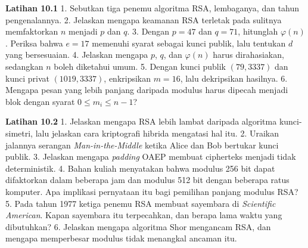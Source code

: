 
\begin{obereflection}
\textbf{Latihan 10.1}
1. Sebutkan tiga penemu algoritma RSA, lembaganya, dan tahun pengenalannya.
2. Jelaskan mengapa keamanan RSA terletak pada sulitnya memfaktorkan $n$
   menjadi $p$ dan $q$.
3. Dengan $p = 47$ dan $q = 71$, hitunglah $\varphi(n)$. Periksa bahwa
   $e = 17$ memenuhi syarat sebagai kunci publik, lalu tentukan $d$ yang
   bersesuaian.
4. Jelaskan mengapa $p$, $q$, dan $\varphi(n)$ harus dirahasiakan, sedangkan
   $n$ boleh diketahui umum.
5. Dengan kunci publik $(79, 3337)$ dan kunci privat $(1019, 3337)$,
   enkripsikan $m = 16$, lalu dekripsikan hasilnya.
6. Mengapa pesan yang lebih panjang daripada modulus harus dipecah menjadi
   blok dengan syarat $0 \le m_i \le n-1$?
\end{obereflection}

\begin{obereflection}
\textbf{Latihan 10.2}
1. Jelaskan mengapa RSA lebih lambat daripada algoritma kunci-simetri, lalu
   jelaskan cara kriptografi hibrida mengatasi hal itu.
2. Uraikan jalannya serangan \textit{Man-in-the-Middle} ketika Alice dan Bob
   bertukar kunci publik.
3. Jelaskan mengapa \textit{padding} OAEP membuat cipherteks menjadi tidak
   deterministik.
4. Bahan kuliah menyatakan bahwa modulus 256 bit dapat difaktorkan dalam
   beberapa jam dan modulus 512 bit dengan beberapa ratus komputer. Apa
   implikasi pernyataan itu bagi pemilihan panjang modulus RSA?
5. Pada tahun 1977 ketiga penemu RSA membuat sayembara di \textit{Scientific
   American}. Kapan sayembara itu terpecahkan, dan berapa lama waktu yang
   dibutuhkan?
6. Jelaskan mengapa algoritma Shor mengancam RSA, dan mengapa memperbesar
   modulus tidak menangkal ancaman itu.
\end{obereflection}
